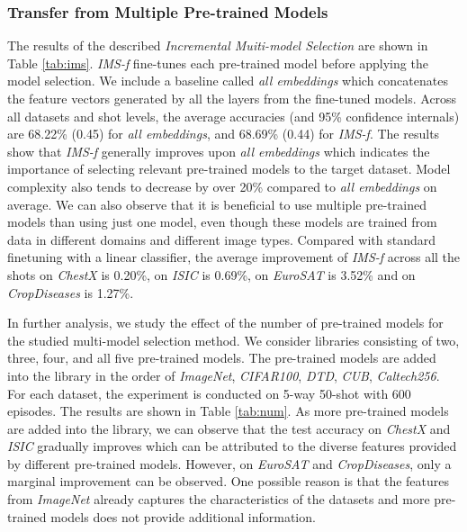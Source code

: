 \documentclass[runningheads]{llncs}
\begin{document}
\subsubsection{Transfer from Multiple Pre-trained Models}
\label{subsec:multi}


The results of the described \textit{Incremental Muiti-model Selection} are shown in Table \ref{tab:ims}. \emph{IMS-f} fine-tunes each pre-trained model before applying the model selection. We include a baseline called \emph{all embeddings} which concatenates the feature vectors generated by all the layers from the fine-tuned models. Across all datasets and shot levels, the average accuracies (and 95\% confidence internals) are 68.22\% (0.45) for \emph{all embeddings}, and 68.69\% (0.44) for \emph{IMS-f}. The results show that \emph{IMS-f} generally improves upon \emph{all embeddings} which indicates the importance of selecting relevant pre-trained models to the target dataset. Model complexity also tends to decrease by over 20\% compared to \emph{all embeddings} on average. We can also observe that it is beneficial to use multiple pre-trained models than using just one model, even though these models are trained from data in different domains and different image types. Compared with standard finetuning with a linear classifier, the average improvement of \emph{IMS-f} across all the shots on \textit{ChestX} is 0.20\%, on \textit{ISIC} is 0.69\%, on \textit{EuroSAT} is 3.52\% and on \textit{CropDiseases} is 1.27\%.

In further analysis, we study the effect of the number of pre-trained models for the studied multi-model selection method. We consider libraries consisting of two, three, four, and all five pre-trained models. The pre-trained models are added into the library in the order of \textit{ImageNet}, \textit{CIFAR100}, \textit{DTD}, \textit{CUB}, \textit{Caltech256}. For each dataset, the experiment is conducted on 5-way 50-shot with 600 episodes. The results are shown in Table \ref{tab:num}. As more pre-trained models are added into the library, we can observe that the test accuracy on \textit{ChestX} and \textit{ISIC} gradually improves which can be attributed to the diverse features provided by different pre-trained models. However, on \textit{EuroSAT} and \textit{CropDiseases}, only a marginal improvement can be observed. One possible reason is that the features from \textit{ImageNet} already captures the characteristics of the datasets and more pre-trained models does not provide additional information.
\end{document}
